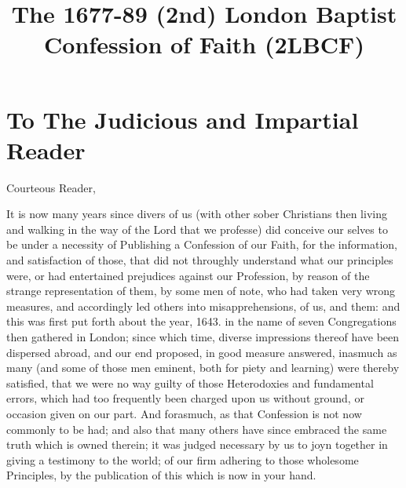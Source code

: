 \documentclass[12pt,a4paper]{book}
\title{The 1677-89 (2nd) London Baptist Confession of Faith (2LBCF)}
\date{}
\begin{document}
\frontmatter
\maketitle

\tableofcontents

\chapter{To The Judicious and Impartial Reader}
Courteous Reader,

It is now many years since divers of us (with other sober Christians then living and walking in the way of the Lord that we professe) did conceive our selves to be under a necessity of Publishing a Confession of our Faith, for the information, and satisfaction of those, that did not throughly understand what our principles were, or had entertained prejudices against our Profession, by reason of the strange representation of them, by some men of note, who had taken very wrong measures, and accordingly led others into misapprehensions, of us, and them: and this was first put forth about the year, 1643. in the name of seven Congregations then gathered in London; since which time, diverse impressions thereof have been dispersed abroad, and our end proposed, in good measure answered, inasmuch as many (and some of those men eminent, both for piety and learning) were thereby satisfied, that we were no way guilty of those Heterodoxies and fundamental errors, which had too frequently been charged upon us without ground, or occasion given on our part. And forasmuch, as that Confession is not now commonly to be had; and also that many others have since embraced the same truth which is owned therein; it was judged necessary by us to joyn together in giving a testimony to the world; of our firm adhering to those wholesome Principles, by the publication of this which is now in your hand.
\end{document}
